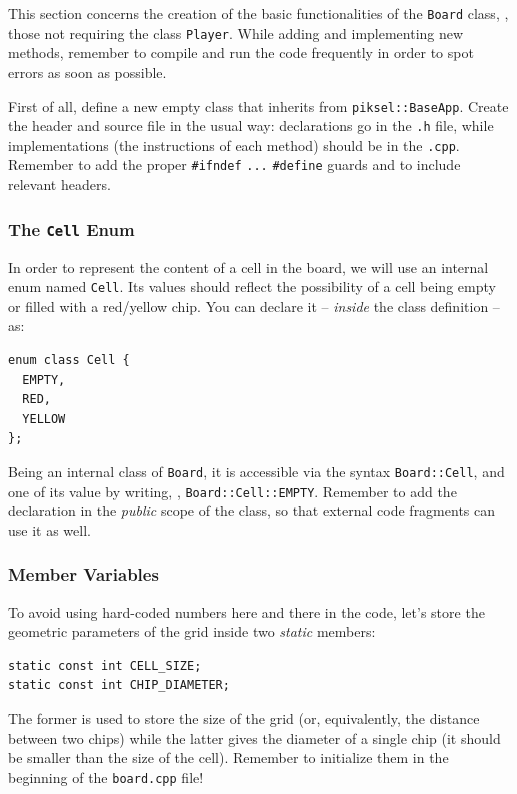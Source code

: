 \documentclass{article}
\begin{document}
This section concerns the creation of the basic functionalities of the \texttt{Board} class, \ie, those not requiring the class \texttt{Player}. While adding and implementing new methods, remember to compile and run the code frequently in order to spot errors as soon as possible.

First of all, define a new empty class that inherits from \texttt{piksel::BaseApp}. Create the header and source file in the usual way: declarations go in the \texttt{.h} file, while implementations (the instructions of each method) should be in the \texttt{.cpp}. Remember to add the proper \texttt{\#ifndef} \texttt{...} \texttt{\#define} guards and to include relevant headers.





\subsubsection{The \texttt{Cell} Enum}

In order to represent the content of a cell in the board, we will use an internal enum named \texttt{Cell}. Its values should reflect the possibility of a cell being empty or filled with a red/yellow chip. You can declare it -- \emph{inside} the class definition -- as:
\begin{center}
\begin{minipage}{.9\textwidth}
\begin{lstlisting}[style=mycpp,numbers=none]
enum class Cell {
  EMPTY,
  RED,
  YELLOW
};
\end{lstlisting}
\end{minipage}
\end{center}

Being an internal class of \texttt{Board}, it is accessible via the syntax \texttt{Board::Cell}, and one of its value by writing, \eg, \texttt{Board::Cell::EMPTY}. Remember to add the declaration in the \emph{public} scope of the class, so that external code fragments can use it as well.

\subsubsection{Member Variables}

To avoid using hard-coded numbers here and there in the code, let's store the geometric parameters of the grid inside two \emph{static} members:
\begin{center}
\begin{minipage}{.9\textwidth}
\begin{lstlisting}[style=mycpp,numbers=none]
static const int CELL_SIZE;
static const int CHIP_DIAMETER;
\end{lstlisting}
\end{minipage}
\end{center}
The former is used to store the size of the grid (or, equivalently, the distance between two chips) while the latter gives the diameter of a single chip (it should be smaller than the size of the cell). Remember to initialize them in the beginning of the \texttt{board.cpp} file!
\end{document}
